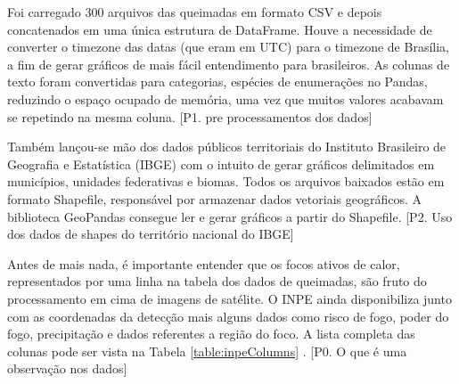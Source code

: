 \documentclass[cic,tc]{iiufrgs}
\begin{document}
Foi carregado 300 arquivos das queimadas em formato CSV e depois concatenados
em uma única estrutura de DataFrame. Houve a necessidade de converter o timezone 
das datas (que eram em UTC) para o timezone de Brasília, a fim de gerar gráficos 
de mais fácil entendimento para brasileiros. As colunas de texto foram convertidas 
para categorias, espécies de enumerações no Pandas, reduzindo o espaço ocupado 
de memória, uma vez que muitos valores acabavam se repetindo na mesma coluna. 
[P1. pre processamentos dos dados]\par

Também lançou-se mão dos dados públicos territoriais do Instituto Brasileiro de 
Geografia e Estatística (IBGE) com o intuito de gerar gráficos delimitados em 
municípios, unidades federativas e biomas. Todos os arquivos baixados estão em 
formato Shapefile, responsável por armazenar dados vetoriais geográficos. A 
biblioteca GeoPandas consegue ler e gerar gráficos a partir do Shapefile.
[P2. Uso dos dados de shapes do território nacional do IBGE] \par


Antes de mais nada, é importante entender que os focos ativos de calor, 
representados por uma linha na tabela dos dados de queimadas, são fruto do 
processamento em cima de imagens de satélite. O INPE ainda 
disponibiliza junto com as coordenadas da detecção mais alguns dados como 
risco de fogo, poder do fogo, precipitação e dados referentes a região do foco. 
A lista completa das colunas pode ser vista na Tabela \ref{table:inpeColumns}
 \cite{PerguntasFrequentesINPE}.
[P0. O que é uma observação nos dados] \par
\end{document}
